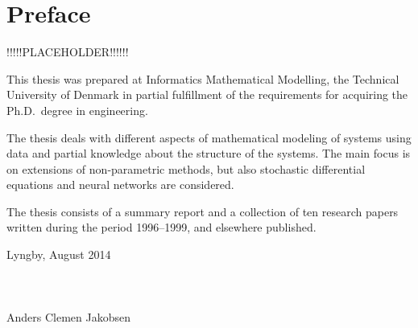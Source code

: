 \chapter{Preface}

!!!!!PLACEHOLDER!!!!!!

This thesis was prepared at Informatics Mathematical Modelling,
the Technical University of Denmark in partial fulfillment of the
requirements for acquiring the Ph.D.\ degree in engineering.

The thesis deals with different aspects of mathematical modeling of
systems using data and partial knowledge about the structure of the
systems.  The main focus is on extensions of non-parametric methods,
but also stochastic differential equations and neural networks are
considered.

The thesis consists of a summary report and a collection of ten
research papers written during the period 1996--1999, and elsewhere
published.

\vspace{20mm}
\mbox{}\hfill
\begin{minipage}[t]{80mm}
  Lyngby, August 2014
  \\ \\ \\ \\
  Anders Clemen Jakobsen
\end{minipage}
